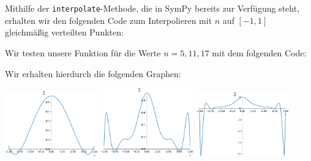 \section{}



\subsection{}

Mithilfe der \texttt{interpolate}-Methode, die in SymPy bereits zur Verfügung steht, erhalten wir den folgenden Code zum Interpolieren mit $n$ auf $[-1,1]$ gleichmäßig verteilten Punkten:



Wir testen unsere Funktion für die Werte $n = 5, 11, 17$ mit dem folgenden Code:



Wir erhalten hierdurch die folgenden Graphen:

\begin{center}
  \includegraphics[width = 0.3\textwidth]{chapter_09/exercise_09_47_figure_1.pdf}
  \hspace{1em}
  \includegraphics[width = 0.3\textwidth]{chapter_09/exercise_09_47_figure_2.pdf}
  \hspace{1em}
  \includegraphics[width = 0.3\textwidth]{chapter_09/exercise_09_47_figure_3.pdf}
\end{center}

